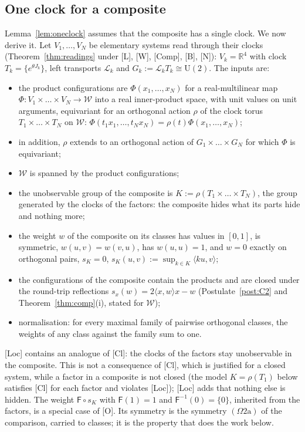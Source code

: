 \documentclass[aps,pra,onecolumn,superscriptaddress,nofootinbib,10pt]{revtex4-2}
\theoremstyle{definition}
\theoremstyle{remark}
\newcommand{\R}{\mathbb{R}}
\newcommand{\cL}{\mathcal{L}}
\newcommand{\ip}[2]{\langle #1,#2\rangle}
\newcommand{\U}{\mathrm{U}}
\begin{document}
\subsection{One clock for a composite}\label{sec:oneclock}
Lemma~\ref{lem:oneclock} assumes that the composite has a single clock.  We now derive it.  Let
$V_1,\dots,V_N$ be elementary systems read through their clocks (Theorem~\ref{thm:readings} under [L],
[W], [Comp], [B], [N]): $V_k=\R^4$ with clock $T_k=\{e^{\theta J_k}\}$, left transports $\cL_k$ and
$G_k:=\cL_kT_k\cong\U(2)$.  The inputs are:
\begin{itemize}[leftmargin=3.6em]
\item[{[Bil]}] the product configurations are $\Phi(x_1,\dots,x_N)$ for a real-multilinear map
$\Phi\colon V_1\times\dots\times V_N\to\mathcal W$ into a real inner-product space, with unit values on unit arguments,
equivariant for an orthogonal action $\rho$ of the clock torus $T_1\times\dots\times T_N$ on $\mathcal W$:
$\Phi(t_1x_1,\dots,t_Nx_N)=\rho(t)\Phi(x_1,\dots,x_N)$;
\item[{[Bil$_\cL$]}] in addition, $\rho$ extends to an orthogonal action of $G_1\times\dots\times G_N$ for which $\Phi$ is
equivariant;
\item[{[Span]}] $\mathcal W$ is spanned by the product configurations;
\item[{[Loc]}] the unobservable group of the composite is $K:=\rho(T_1\times\dots\times T_N)$, the group generated by
the clocks of the factors: the composite hides what its parts hide and nothing more;
\item[{[O]}] the weight $w$ of the composite on its classes has values in $[0,1]$, is symmetric,
$w(u,v)=w(v,u)$, has $w(u,u)=1$, and $w=0$ exactly on orthogonal pairs, $s_K=0$,
$s_K(u,v):=\sup_{k\in K}\ip{ku}{v}$;
\item[C2] the configurations of the composite contain the products and are closed under the round-trip
reflections $s_x(w)=2\ip{x}{w}x-w$ (Postulate~\ref{post:C2} and Theorem~\ref{thm:comp}(i), stated for $\mathcal W$);
\item[{[N]}] normalisation: for every maximal family of pairwise orthogonal classes, the weights of any
class against the family sum to one.
\end{itemize}
[Loc] contains an analogue of [Cl]: the clocks of the factors stay unobservable in the composite.  This is
not a consequence of [Cl], which is justified for a closed system, while a factor in a composite is not
closed (the model $K=\rho(T_1)$ below satisfies [Cl] for each factor and violates [Loc]); [Loc] adds that
nothing else is hidden.  The weight $\mathsf F\circ s_K$ with $\mathsf F(1)=1$ and
$\mathsf F^{-1}(0)=\{0\}$, inherited from the factors, is a special case of [O].  Its symmetry is the symmetry $(\Omega2\mathrm a)$ of the comparison, carried to classes;
it is the property that does the work below.
\end{document}
